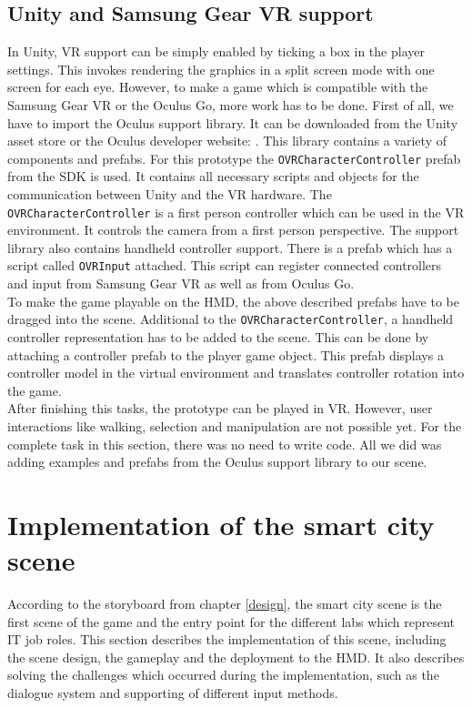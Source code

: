 \subsection{Unity and Samsung Gear VR support} \label{gearvrsupport}
In Unity, VR support can be simply enabled by ticking a box in the player settings. This invokes rendering the graphics in a split screen mode with one screen for each eye. However, to make a game which is compatible with the Samsung Gear VR or the Oculus Go, more work has to be done. First of all, we have to import the Oculus support library. It can be downloaded from the Unity asset store or the Oculus developer website: \cite{Occulus.2018}. This library contains a variety of components and prefabs. For this prototype the \texttt{OVRCharacterController} prefab from the SDK is used. It contains all necessary scripts and objects for the communication between Unity and the VR hardware. The \texttt{OVRCharacterController} is a first person controller which can be used in the VR environment. It controls the camera from a first person perspective. The support library also contains handheld controller support. There is a prefab which has a script called \texttt{OVRInput} attached. This script can register connected controllers and input from Samsung Gear VR as well as from Oculus Go.\\
To make the game playable on the HMD, the above described prefabs have to be dragged into the scene. Additional to the  \texttt{OVRCharacterController}, a handheld controller representation has to be added to the scene. This can be done by attaching a controller prefab to the player game object. This prefab displays a controller model in the virtual environment and translates controller rotation into the game.\\ After finishing this tasks, the prototype can be played in VR. However, user interactions like walking, selection and manipulation are not possible yet. For the complete task in this section, there was no need to write code. All we did was adding examples and prefabs from the Oculus support library to our scene.
\newpage
\section{Implementation of the smart city scene}
According to the storyboard from chapter \ref{design}, the smart city scene is the first scene of the game and the entry point for the different labs which represent IT job roles. This section describes the implementation of this scene, including the scene design, the gameplay and the deployment to the HMD. It also describes solving the challenges which occurred during the implementation, such as the dialogue system and supporting of different input methods.
